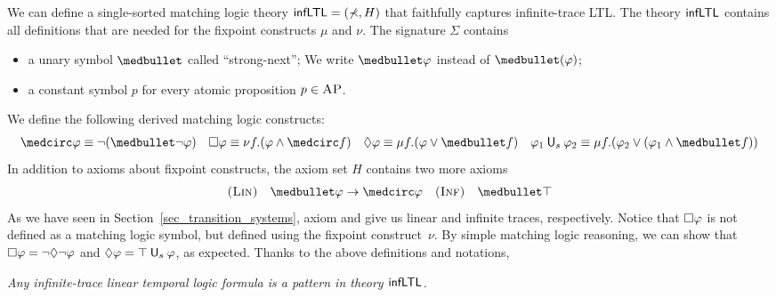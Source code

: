 \documentclass{amsart}
\begin{document}
We can define 
a single-sorted matching logic theory 
$\mathsf{infLTL} = (\mathbb{\Sigma}, H)$ that
faithfully captures infinite-trace LTL.
The theory $\mathsf{infLTL}$ contains all definitions
that are needed for the fixpoint constructs $\mu$ and $\nu$.
The signature $\Sigma$ contains
\begin{itemize}
	\item a unary symbol $\snext$ called ``strong-next'';
	We write $\snext \varphi$ instead of $\snext(\varphi)$;
	\item a constant symbol $p$ for every atomic proposition $p \in \textsc{AP}$.
\end{itemize}
We define the following derived matching logic constructs:
\begin{align*}
\wnext \varphi \equiv \neg (\snext \neg \varphi)
&&
\always \varphi \equiv \nu f . (\varphi \wedge \wnext f)
&&
\eventually \varphi \equiv \mu f . (\varphi \vee \snext f)
&&
\varphi_1 \Us \varphi_2 \equiv \mu f . (\varphi_2 \vee (\varphi_1 \wedge \snext
f))
\end{align*}
In addition to axioms about fixpoint constructs, the axiom set $H$ contains two
more axioms
\begin{align*}
\prule{Lin} \quad \snext \varphi \imp \wnext \varphi
&&
\prule{Inf} \quad \snext \top
\end{align*}
As we have seen in Section~\ref{sec_transition_systems},
axiom \Lin and \Inf give us linear and infinite traces, respectively. 
Notice that ${\square} \varphi$ is not defined as a matching logic symbol, 
but defined using the fixpoint construct~$\nu$.
By simple matching logic reasoning, we can show that
$
{\square} \varphi = \neg {\lozenge} \neg \varphi
$
and 
$
{\lozenge} \varphi = \top \mathbin{\mathsf{U}_s} \varphi
$, as expected.
Thanks to the above definitions and notations,
\begin{center}
	\emph{Any infinite-trace linear temporal logic formula is a pattern
		in theory $\mathsf{infLTL}$.}
\end{center}
%
\end{document}

